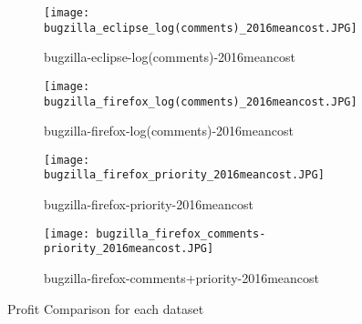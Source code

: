 \begin{figure*}[h]
\begin{subfigure}{\columnwidth}
\texttt{[image: bugzilla\_eclipse\_log(comments)\_2016meancost.JPG]}
\caption{bugzilla-eclipse-log(comments)-2016meancost}
\label{fig:subim1}
\end{subfigure}
\begin{subfigure}{\columnwidth}
\texttt{[image: bugzilla\_firefox\_log(comments)\_2016meancost.JPG]}
\caption{bugzilla-firefox-log(comments)-2016meancost}
\label{fig:subim2}
\end{subfigure}
\begin{subfigure}{\columnwidth}
\texttt{[image: bugzilla\_firefox\_priority\_2016meancost.JPG]}
\caption{bugzilla-firefox-priority-2016meancost}
\label{fig:subim3}
\end{subfigure}
\begin{subfigure}{\columnwidth}
\texttt{[image: bugzilla\_firefox\_comments-priority\_2016meancost.JPG]}
\caption{bugzilla-firefox-comments+priority-2016meancost}
\label{fig:subim4}
\end{subfigure}

\caption{Profit Comparison for each dataset}
\label{fig:DatasetProfit}
\end{figure*}




